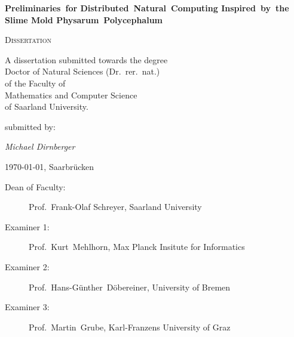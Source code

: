 
\begin{titlepage}
	\centering
	\null\vfill

	{\huge\bfseries Preliminaries~for Distributed~Natural~Computing Inspired~by~the Slime Mold Physarum~Polycephalum\par}


	\vfill

	{\scshape\Large Dissertation}
	\vfill



	{\large A dissertation submitted towards the degree\\ 
	Doctor of Natural Sciences (Dr.~rer.~nat.)\\
	of the Faculty of\\
	Mathematics and Computer Science\\
	of Saarland University.}
	
	\vfill
	submitted by:
	\vfill

	{\Large\itshape Michael Dirnberger}

	\vfill

	{\large \thesisdate\today, Saarbr\"ucken}
	\vfill
\end{titlepage}


\newpage
\null
\vfill
\begin{description}
 	\item[Dean of Faculty:] Prof.~Frank-Olaf Schreyer, Saarland University
	\item[Examiner 1:] Prof.~Kurt~Mehlhorn, Max Planck Insitute for Informatics
	\item[Examiner 2:] Prof.~Hans-G\"unther~D\"obereiner, University of Bremen
	\item[Examiner 3:] Prof.~Martin~Grube, Karl-Franzens University of Graz
\end{description}

\newpage

